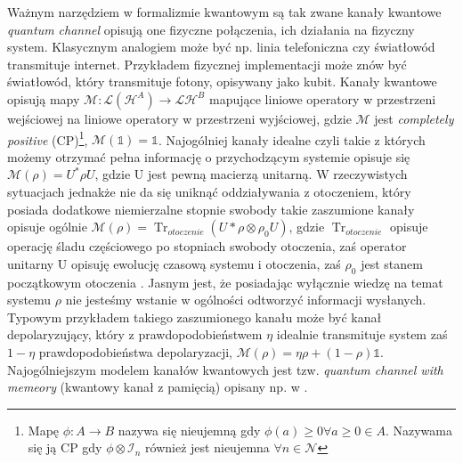 \documentclass[10pt]{article} %
\DeclareMathOperator{\Trs}{Tr}
\newcommand{\Hx}[1]{\mathcal{H}^{#1}}
\newcommand{\I}{\mathbb{1}}
\begin{document}
Ważnym narzędziem w formalizmie kwantowym są tak zwane kanały kwantowe \textit{quantum channel} opisują one fizyczne połączenia, ich działania na fizyczny system. Klasycznym analogiem może być np. linia telefoniczna czy światłowód transmituje internet. 
Przykładem fizycznej implementacji może znów być światłowód, który transmituje fotony, opisywany jako kubit. 
Kanały kwantowe opisują mapy $\mathcal{M}: \mathcal{L}(\Hx{A}) \to \mathcal{L}{\Hx{B}}$ mapujące liniowe operatory w przestrzeni wejściowej na liniowe operatory w przestrzeni wyjściowej, gdzie $\mathcal{M}$ jest \textit{completely positive} (CP)\footnote
{
Mapę $\phi: A \to B$ nazywa się nieujemną gdy $\phi(a) \geq 0 \forall a\geq 0 \in A$. Nazywama się ją CP gdy $\phi \otimes \mathcal{I}_n$ również jest nieujemna $\forall n \in \mathcal{N}$
}, $\mathcal{M}(\mathbb{1}) = \mathbb{1}$. Najogólniej kanały idealne czyli takie z których możemy otrzymać pełna informację o przychodzącym systemie opisuje się $\mathcal{M}(\rho) = U^* \rho U$, gdzie U jest pewną macierzą unitarną. W rzeczywistych sytuacjach jednakże nie da się uniknąć
oddziaływania z otoczeniem, który posiada dodatkowe niemierzalne stopnie swobody takie zaszumione kanały opisuje ogólnie $\mathcal{M}(\rho) = \Trs_{otoczenie}(U* \rho \otimes \rho_0 U)$, gdzie $\Trs_{otoczenie}$ opisuje operację śladu częściowego po stopniach swobody otoczenia, zaś operator unitarny U
opisuję ewolucję czasową systemu i otoczenia, zaś $\rho_0$ jest stanem początkowym otoczenia \cite{fund}. Jasnym jest, że posiadając wyłącznie wiedzę na temat systemu $\rho$ nie jesteśmy wstanie w ogólności odtworzyć informacji wysłanych.
Typowym przykładem takiego zaszumionego kanału może być kanał depolaryzujący, który z prawdopodobieństwem $\eta$ idealnie transmituje system zaś $1-\eta$ prawdopodobieństwa depolaryzacji, $\mathcal{M}(\rho) = \eta\rho+(1-\rho)\I$. Najogólniejszym modelem kanałów kwantowych jest tzw.
\textit{quantum channel with memeory} (kwantowy kanał z pamięcią) opisany np. w \cite{memory}.

\end{document}
